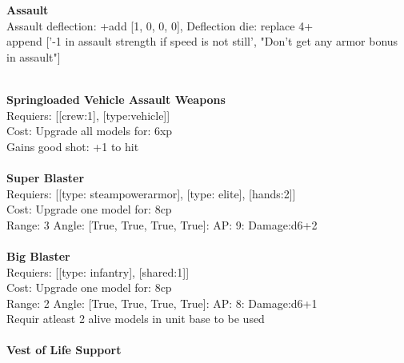 {\bf Assault} \ \\
Assault deflection: +add [1, 0, 0, 0], Deflection die: replace 4+
\\ 

append ['-1 in assault strength if speed is not still', "Don't get any armor bonus in assault"]


\ \\
{\bf Springloaded Vehicle Assault Weapons } \\

Requiers: [[crew:1], [type:vehicle]] \\
Cost: Upgrade all models for: 6xp \\
Gains good shot: +1 to hit\\ 









\ \\
{\bf Super Blaster } \\

Requiers: [[type: steampowerarmor], [type: elite], [hands:2]] \\
Cost: Upgrade one model for: 8cp \\


Range: 3  Angle: [True, True, True, True]: AP: 9: Damage:d6+2 \\








\ \\
{\bf Big Blaster } \\

Requiers: [[type: infantry], [shared:1]] \\
Cost: Upgrade one model for: 8cp \\


Range: 2  Angle: [True, True, True, True]: AP: 8: Damage:d6+1 \\
Requir atleast 2 alive models in unit base to be used\\ 








\ \\
{\bf Vest of Life Support } \\

